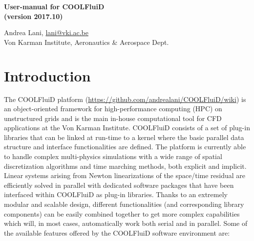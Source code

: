 \documentclass[11pt]{article}
\newcommand{\noi}{\noindent}
\begin{document}
\pagestyle{empty}

\begin{center}
  {\fontsize{14}{20}\bf 
    User-manual for COOLFluiD  \\
    (version 2017.10) \\[10pt]}
\end{center}

\begin{center}
  {Andrea Lani, \underline{lani@vki.ac.be} \\
    Von Karman Institute, Aeronautics \& Aerospace Dept.}
\end{center}

\section*{Introduction}

\noi
The COOLFluiD platform (\url{https://github.com/andrealani/COOLFluiD/wiki})
\cite{lani05, lani06, phd:lani, phd:quintino, phd:wuilbaut} is an object-oriented 
framework for high-performance computing (HPC) on unstructured grids and 
is the main in-house computational tool for CFD applications at the Von Karman Institute.
COOLFluiD consists of a set of plug-in libraries that 
can be linked at run-time to a kernel where the basic parallel
data structure and interface functionalities are defined.  
The platform is currently able to handle complex multi-physics simulations
with a wide range of spatial discretization algorithms
and time marching methods, both explicit and implicit.  
Linear systems arising from Newton linearizations of the space/time residual are efficiently solved 
in parallel with dedicated software packages that have been interfaced within COOLFluiD 
as plug-in libraries. Thanks to an extremely modular and scalable design, different 
functionalities (and corresponding library components) can be easily 
combined together to get more complex capabilities which will, in most cases, 
automatically work both serial and in parallel. Some of the available
features offered by the COOLFluiD software environment are:
\end{document}
